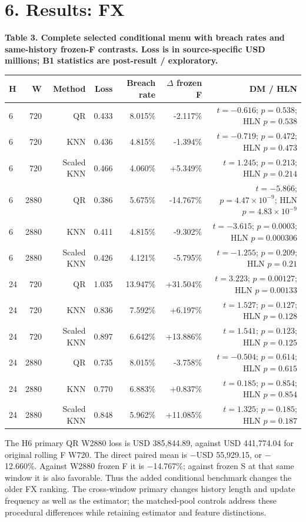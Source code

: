\documentclass[10pt,a4paper]{article}
\begin{document}
\section*{6. Results: FX}
\begin{center}
\begin{minipage}{\linewidth}
\small\textbf{Table 3. Complete selected conditional menu with breach rates and same-history frozen-F contrasts. Loss is in source-specific USD millions; B1 statistics are post-result / exploratory.}\par\medskip
\centering\fontsize{8}{10}\selectfont
\begin{tabular}{lrrrrrr}
\toprule
H & W & Method & Loss & Breach rate & \(\Delta\) frozen F & DM / HLN \\
\midrule
6 & 720 & QR & 0.433 & 8.015\% & -2.117\% & \(t=-0.616\); \(p=0.538\); HLN \(p=0.538\) \\
6 & 720 & KNN & 0.436 & 4.815\% & -1.394\% & \(t=-0.719\); \(p=0.472\); HLN \(p=0.473\) \\
6 & 720 & Scaled KNN & 0.466 & 4.060\% & +5.349\% & \(t=1.245\); \(p=0.213\); HLN \(p=0.214\) \\
6 & 2880 & QR & 0.386 & 5.675\% & -14.767\% & \(t=-5.866\); \(p=4.47\times10^{-9}\); HLN \(p=4.83\times10^{-9}\) \\
6 & 2880 & KNN & 0.411 & 4.815\% & -9.302\% & \(t=-3.615\); \(p=0.0003\); HLN \(p=0.000306\) \\
6 & 2880 & Scaled KNN & 0.426 & 4.121\% & -5.795\% & \(t=-1.255\); \(p=0.209\); HLN \(p=0.21\) \\
24 & 720 & QR & 1.035 & 13.947\% & +31.504\% & \(t=3.223\); \(p=0.00127\); HLN \(p=0.00133\) \\
24 & 720 & KNN & 0.836 & 7.592\% & +6.197\% & \(t=1.527\); \(p=0.127\); HLN \(p=0.128\) \\
24 & 720 & Scaled KNN & 0.897 & 6.642\% & +13.886\% & \(t=1.541\); \(p=0.123\); HLN \(p=0.125\) \\
24 & 2880 & QR & 0.735 & 8.015\% & -3.758\% & \(t=-0.504\); \(p=0.614\); HLN \(p=0.615\) \\
24 & 2880 & KNN & 0.770 & 6.883\% & +0.837\% & \(t=0.185\); \(p=0.854\); HLN \(p=0.854\) \\
24 & 2880 & Scaled KNN & 0.848 & 5.962\% & +11.085\% & \(t=1.325\); \(p=0.185\); HLN \(p=0.187\) \\
\bottomrule
\end{tabular}
\end{minipage}
\end{center}
The H6 primary QR W2880 loss is USD 385,844.89, against USD 441,774.04 for original rolling F W720. The direct paired mean is \(-\)USD 55,929.15, or \(-\)12.660\%. Against W2880 frozen F it is \(-\)14.767\%; against frozen S at that same window it is also favorable. Thus the added conditional benchmark changes the older FX ranking. The cross-window primary changes history length and update frequency as well as the estimator; the matched-pool controls address these procedural differences while retaining estimator and feature distinctions.
\end{document}
